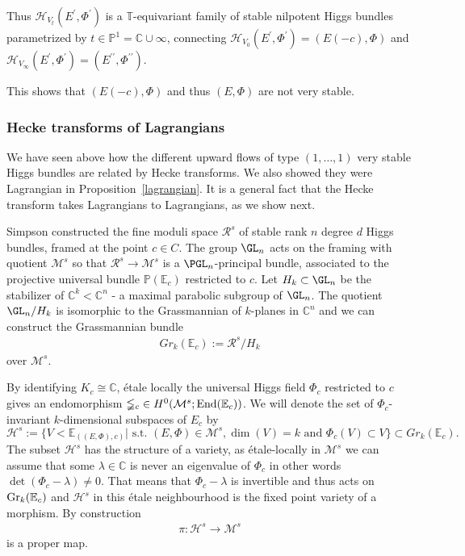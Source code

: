 \documentclass[12pt]{article}
\numberwithin{equation}{section}
\theoremstyle{remark}
\theoremstyle{definition}
\numberwithin{theorem}{section}
\def\beq{\begin{eqnarray}}
\def\eeq{\end{eqnarray}}
\def\bPhi{{\mathbb{\Phi}}}
\def\E{\mathbb{E}}
\def\C{\mathbb{C}}
\def\M{{\mathcal{M}}}
\def\calH{\mathcal{H}}
\def\P{\mathbb{P}}
\newcommand{\T}{{\mathbb{T}}}
\newcommand{\calR}{\mathcal{R}}
\newcommand{\Gr}{\textnormal{Gr}}
\newcommand{\End}{\textnormal{End}}
\renewcommand{\1}{\mathbbm{1}}
\begin{document}
Thus $\calH_{V_t}(E^\prime,\Phi^\prime)$ is a $
\T$-equivariant family of stable nilpotent Higgs bundles parametrized by $t\in \P^1=\C\cup \infty$, connecting $\calH_{V_0}(E^\prime,\Phi^\prime)=(E(-c),\Phi)$ and $\calH_{V_\infty}(E^\prime,\Phi^\prime)=(E^{\prime\prime},\Phi^{\prime\prime})$.

This shows that $(E(-c),\Phi)$ and thus $(E,\Phi)$ are not very stable. 

\subsubsection{Hecke transforms of Lagrangians}
We have seen above how the different  upward flows of  type $(1,\dots,1)$ very stable Higgs bundles are related by Hecke transforms. We also showed they were Lagrangian in Proposition~\ref{lagrangian}. It is a general fact that the Hecke transform takes Lagrangians to Lagrangians, as we show next.

Simpson constructed \cite[Theorem 4.10]{simpson1} the fine moduli space $\calR^s$ of  stable rank $n$ degree $d$ Higgs bundles, framed at the point $c\in C$. The group $\GL_n$ acts on the framing with quotient  $\M^s$ so that $\calR^s\to \M^s$ is a $\PGL_n$-principal bundle, associated to the projective universal bundle $\P(\E_c)$ restricted to $c$. Let $H_k\subset \GL_n$ be the stabilizer of $\C^k<\C^n$ - a maximal parabolic subgroup of $\GL_n$. The quotient  $\GL_n/H_k$ is isomorphic to the Grassmannian of $k$-planes in $\C^n$ and we can construct the Grassmannian bundle \beq \label{grassmann} Gr_k(\E_c):=\calR^s/H_k\eeq over $\M^s$. 

By identifying $K_c\cong \C$, \'etale locally the universal Higgs field $\bPhi_c$ restricted to $c$ gives an endomorphism $\bPhi_c\in H^0(\M^s;\End(\E_c))$. We will denote the set of $\Phi_c$-invariant $k$-dimensional subspaces of $E_c$ by $$\calH^s:=\{V< \E_{((E,\Phi),c)} | \mbox{ s.t. } 
(E,\Phi)\in \M^s, \dim(V)=k \mbox{ and } \Phi_c(V)\subset V \}\subset Gr_k(\E_c).$$ The subset $\calH^s$ has the structure of a variety, as \'etale-locally in $\M^s$ we can assume that  some $\lambda\in\C$ is never an eigenvalue of $\Phi_c$ in other words $\det(\Phi_c-\lambda)\neq 0$. That means that $\bPhi_c-\lambda$ is invertible and thus acts on $\Gr_k(\E_c)$ and  $\calH^s$ in this \'etale neighbourhood is the fixed point variety of a morphism. By construction \beq\label{proper}\pi:\calH^s\to \M^s\eeq is a proper map.
\end{document}
